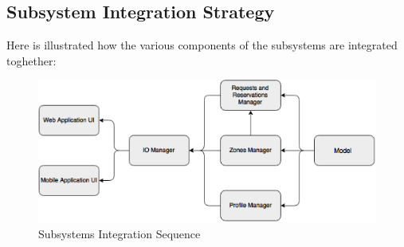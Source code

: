 \documentclass[../../../../../../testPlan.tex]{subfiles}
\begin{document}
	\subsection{Subsystem Integration Strategy}
		Here is illustrated how the various components of the subsystems are integrated toghether:
		\begin{figure}[H]
			\centering
			\includegraphics[width=\textwidth, scale=0.5]{../images/priority_subsystems.png}
			\caption{Subsystems Integration Sequence}\label{fig:SubsystemsSequence}
		\end{figure}
	
	 
\end{document}
